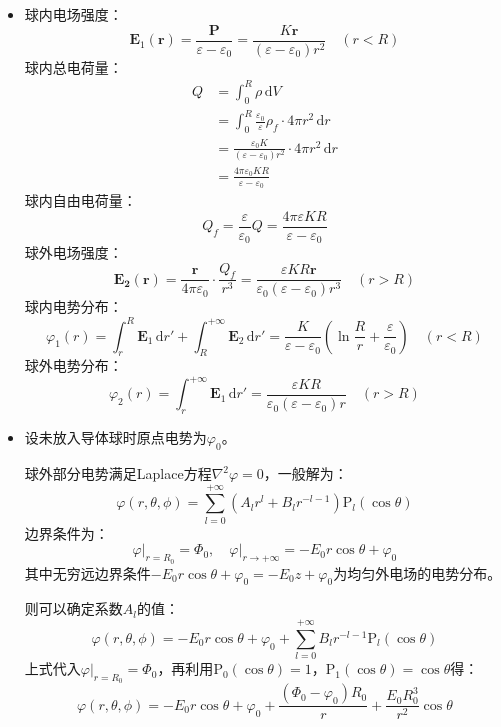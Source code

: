 \documentclass[a4paper,fontset=none]{ctexart}
\begin{document}
\begin{itemize}
        \item[1.(3)]
        球内电场强度：
        \[
        \bm{E}_1(\bm{r}) = \frac{\bm{P}}{\varepsilon-\varepsilon_0} = \frac{K\bm{r}}{(\varepsilon-\varepsilon_0)r^2}\quad (r<R)
        \]
        球内总电荷量：
        \begin{align*}
            Q
            &= \int_0^R\rho\,\mathrm{d}V \\
            &= \int_0^R\frac{\varepsilon_0}{\varepsilon}\rho_f\cdot4\pi r^2\,\mathrm{d}r \\
            &= \frac{\varepsilon_0 K}{(\varepsilon-\varepsilon_0)r^2}\cdot4\pi r^2\,\mathrm{d}r \\
            &= \frac{4\pi\varepsilon_0KR}{\varepsilon-\varepsilon_0}
        \end{align*}
        球内自由电荷量：
        \[
        Q_f = \frac{\varepsilon}{\varepsilon_0}Q = \frac{4\pi\varepsilon KR}{\varepsilon-\varepsilon_0}
        \]
        球外电场强度：
        \[
        \bm{E_2}(\bm{r}) = \frac{\bm{r}}{4\pi\varepsilon_0}\cdot\frac{Q_f}{r^3} = \frac{\varepsilon KR\bm{r}}{\varepsilon_0(\varepsilon-\varepsilon_0)r^3}\quad (r>R)
        \]
        球内电势分布：
        \[
        \varphi_1(r) = \int_r^R\bm{E}_1\,\mathrm{d}r' + \int_R^{+\infty}\bm{E}_2\,\mathrm{d}r' = \frac{K}{\varepsilon-\varepsilon_0}(\ln\frac{R}{r} + \frac{\varepsilon}{\varepsilon_0})\quad (r<R)
        \]
        球外电势分布：
        \[
        \varphi_2(r) = \int_r^{+\infty}\bm{E}_1\,\mathrm{d}r' = \frac{\varepsilon KR}{\varepsilon_0(\varepsilon-\varepsilon_0)r}\quad (r>R)
        \]

        \item[2.(1)]
        设未放入导体球时原点电势为$\varphi_0$。

        球外部分电势满足Laplace方程$\nabla^2\varphi=0$，一般解为：
        \[
        \varphi(r,\theta,\phi) = \sum_{l=0}^{+\infty}\left(A_l r^l + B_l r^{-l-1}\right)\mathrm{P}_l(\cos\theta)
        \]
        边界条件为：
        \[
        \left.\varphi\right|_{r=R_0} = \Phi_0,\quad
        \left.\varphi\right|_{r\to+\infty} = -E_0 r\cos\theta + \varphi_0
        \]
        其中无穷远边界条件$-E_0r\cos\theta+\varphi_0=-E_0z+\varphi_0$为均匀外电场的电势分布。

        则可以确定系数$A_l$的值：
        \[
        \varphi(r,\theta,\phi) = -E_0 r\cos\theta + \varphi_0 + \sum_{l=0}^{+\infty}B_l r^{-l-1}\mathrm{P}_l(\cos\theta)
        \]
        上式代入$\left.\varphi\right|_{r=R_0}=\Phi_0$，再利用$\mathrm{P}_0(\cos\theta)=1$，$\mathrm{P}_1(\cos\theta)=\cos\theta$得：
        \[
        \varphi(r,\theta,\phi) = -E_0 r\cos\theta + \varphi_0 + \frac{(\Phi_0-\varphi_0)R_0}{r} + \frac{E_0R_0^3}{r^2}\cos\theta
        \]


\end{itemize}
\end{document}
